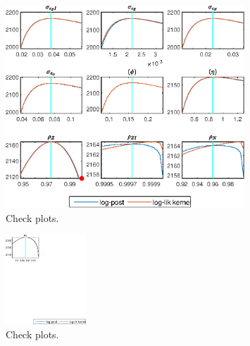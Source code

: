  
\begin{figure}[H]
\centering 
\includegraphics[width=0.80\textwidth]{BRS_comovement/graphs/BRS_comovement_CheckPlots1}
\caption{Check plots.}\label{Fig:CheckPlots:1}
\end{figure}
 
\begin{figure}[H]
\centering 
\includegraphics[width=0.27\textwidth]{BRS_comovement/graphs/BRS_comovement_CheckPlots2}
\caption{Check plots.}\label{Fig:CheckPlots:2}
\end{figure}
 
